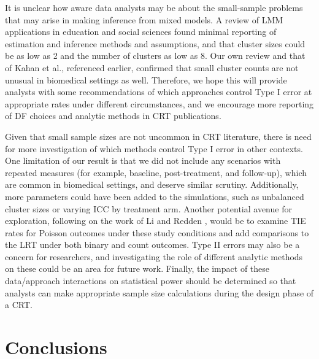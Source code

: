 \documentclass[twocolumn]{bmcart}%
\begin{document}
It is unclear how aware data analysts may be about the small-sample problems that may arise in making inference from mixed models. A review of LMM applications in education and social sciences \cite{dedrick_multilevel_2009} found minimal reporting of estimation and inference methods and assumptions, and that cluster sizes could be as low as 2 and the number of clusters as low as 8. Our own review and that of Kahan et al., referenced earlier, confirmed that small cluster counts are not unusual in biomedical settings as well. Therefore, we hope this will provide analysts with some recommendations of which approaches control Type I error at appropriate rates under different circumstances, and we encourage more reporting of DF choices and analytic methods in CRT publications.

Given that small sample sizes are not uncommon in CRT literature, there is need for more investigation of which methods control Type I error in other contexts. One limitation of our result is that we did not include any scenarios with repeated measures (for example, baseline, post-treatment, and follow-up), which are common in biomedical settings, and deserve similar scrutiny. Additionally, more parameters could have been added to the simulations, such as unbalanced cluster sizes or varying ICC by treatment arm. Another potential avenue for exploration, following on the work of Li and Redden \cite{li_comparing_2015}, would be to examine TIE rates for Poisson outcomes under these study conditions and add comparisons to the LRT under both binary and count outcomes. Type II errors may also be a concern for researchers, and investigating the role of different analytic methods on these could be an area for future work. Finally, the impact of these data/approach interactions on statistical power should be determined so that analysts can make appropriate sample size calculations during the design phase of a CRT.



\section*{Conclusions}



\end{document}
